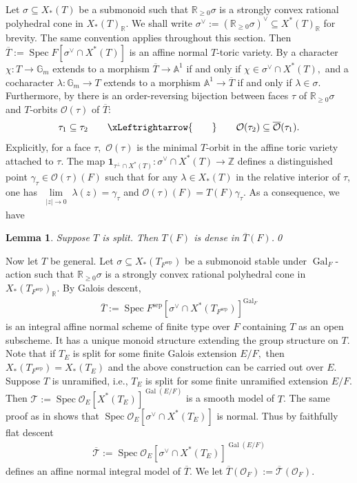 \documentclass[10pt]{amsart}
\newtheorem{lemma}[theorem]{Lemma}
\theoremstyle{definition}
\numberwithin{equation}{section}
\DeclareMathOperator{\Spec}{\mathrm{Spec}}
\DeclareMathOperator{\Gal}{\mathrm{Gal}}
\numberwithin{equation}{subsection}
\newcommand{\ZZ}{\mathbb{Z}}
\newcommand{\RR}{\mathbb{R}}
\begin{document}
Let $\sigma \subseteq X_*(T)$ be a submonoid such that $\RR_{\ge 0}\sigma$ is a strongly convex rational polyhedral cone in $X_*(T)_{\mathbb{R}}$. We shall write $\sigma^\vee := (\mathbb{R}_{\geq0}\sigma)^\vee\subseteq X^*(T)_\RR$ for brevity. The same convention applies throughout this section. Then $\overline{T}:=\Spec F[\sigma^\lor\cap X^\ast(T)]$ is an affine normal $T$-toric variety.  By \cite[\S2.3]{Fulton:toric} a character $\chi:T\to\mathbb{G}_m$ extends to a morphism $\overline{T}\to\mathbb{A}^1$ if and only if $\chi\in \sigma^\vee\cap X^*(T),$ and a cocharacter $\lambda:\mathbb{G}_m\to T$ extends to a morphism $\mathbb{A}^1\to \overline{T}$ if and only if $\lambda\in \sigma$. Furthermore, by \cite[\S3.1]{Fulton:toric} there is an order-reversing bijection between faces $\tau$ of $\RR_{\ge 0}\sigma$ and $T$-orbits $\mathcal{O}(\tau)$ of $\overline{T}:$
\begin{align*}
    \tau_1\subseteq \tau_2 \quad\quad \xLeftrightarrow{\qquad}\quad\quad \mathcal{O}(\tau_2)\subseteq \overline{\mathcal{O}}(\tau_1). 
\end{align*}
Explicitly, for a face $\tau,$ $\mathcal{O}(\tau)$ is the minimal $T$-orbit in the affine toric variety attached to $\tau$. The map $\mathbf{1}_{\tau^\perp\cap X^*(T)}:\sigma^\lor\cap X^\ast(T)\longrightarrow \ZZ$ defines a distinguished point $\gamma_\tau\in\mathcal{O}(\tau)(F)$ such that for any $\lambda \in X_*(T)$ in the relative interior of $\tau$, one has $\lim\limits_{\substack{|z|\to 0}}\lambda(z) = \gamma_\tau$ and $\mathcal{O}(\tau)(F)=T(F)\gamma_\tau.$ As a consequence, we have

\begin{lemma}\label{toricdense} Suppose $T$ is split. Then $T(F)$ is dense in $\overline{T}(F)$.\qed
\end{lemma}


Now let $T$ be general. Let $\sigma \subseteq X_*(T_{F^{\mathrm{sep}}})$ be a submonoid stable under $\Gal_F$-action such that $\RR_{\ge 0}\sigma$ is a strongly convex rational polyhedral cone in $X_*(T_{F^{\mathrm{sep}}})_{\mathbb{R}}$. By Galois descent, 
\begin{align*}
    \overline{T}:=\Spec F^{\mathrm{sep}}[\sigma^\vee\cap X^*(T_{F^{\mathrm{sep}}})]^{\Gal_F}
\end{align*}
is an integral affine normal scheme of finite type over $F$ containing $T$ as an open subscheme. It has a unique monoid structure extending the group structure on $T$. Note that if $T_E$ is split for some finite Galois extension $E/F,$ then $X_\ast(T_{F^{\mathrm{sep}}})=X_\ast(T_E)$ and the above construction can be carried out over $E$. Suppose $T$ is unramified, i.e.,  $T_E$ is split for some finite unramified extension $E/F$. Then $\mathcal{T}:=\Spec\mathcal{O}_{E}[X^*(T_{E})]^{\Gal(E/F)}$ is a smooth model of $T$. The same proof as in \cite[\S 2.1]{Fulton:toric} shows that $\Spec\mathcal{O}_{E}[\sigma^\vee\cap X^*(T_{E})]$ is normal. Thus by faithfully flat descent
\begin{align*}
    \overline{\mathcal{T}}:=\Spec\mathcal{O}_{E}[\sigma^\vee\cap X^*(T_{E})]^{\Gal(E/F)}
\end{align*}
defines an affine normal integral model of $\overline{T}$. We let $\overline{T}(\mathcal{O}_F):=\overline{\mathcal{T}}(\mathcal{O}_F).$
\end{document}
